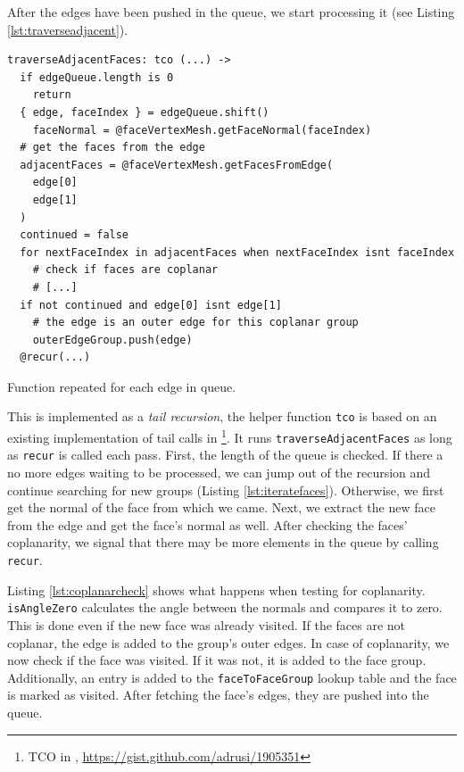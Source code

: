 \documentclass[../ClassicThesis.tex]{subfiles}
\begin{document}
After the edges have been pushed in the queue, we start processing it (see Listing \ref{lst:traverseadjacent}).  

\begin{listing}
\begin{verbatim}
traverseAdjacentFaces: tco (...) ->
  if edgeQueue.length is 0
    return
  { edge, faceIndex } = edgeQueue.shift()
    faceNormal = @faceVertexMesh.getFaceNormal(faceIndex)
  # get the faces from the edge
  adjacentFaces = @faceVertexMesh.getFacesFromEdge(
    edge[0]
    edge[1]
  )
  continued = false
  for nextFaceIndex in adjacentFaces when nextFaceIndex isnt faceIndex
    # check if faces are coplanar
    # [...]
  if not continued and edge[0] isnt edge[1]
    # the edge is an outer edge for this coplanar group
    outerEdgeGroup.push(edge)
  @recur(...)
\end{verbatim}
\caption{Function repeated for each edge in queue.}
\label{lst:traverseadjacent}
\end{listing}


This is implemented as a \emph{tail recursion}, the helper function \texttt{tco} is based on an existing implementation of tail calls in \coffeescript\footnote{TCO in \coffeescript, \url{https://gist.github.com/adrusi/1905351}}. It runs \texttt{traverseAdjacentFaces} as long as \texttt{recur} is called each pass. First, the length of the queue is checked. If there a no more edges waiting to be processed, we can jump out of the recursion and continue searching for new groups (Listing \ref{lst:iteratefaces}). Otherwise, we first get the normal of the face from which we came. Next, we extract the new face from the edge and get the face's normal as well. After checking the faces' coplanarity, we signal that there may be more elements in the queue by calling \texttt{recur}.

Listing \ref{lst:coplanarcheck} shows what happens when testing for coplanarity. \texttt{isAngleZero} calculates the angle between the normals and compares it to zero. This is done even if the new face was already visited. If the faces are not coplanar, the edge is added to the group's outer edges. In case of coplanarity, we now check if the face was visited. If it was not, it is added to the face group. Additionally, an entry is added to the \texttt{faceToFaceGroup} lookup table and the face is marked as visited. After fetching the face's edges, they are pushed into the queue.
\end{document}
